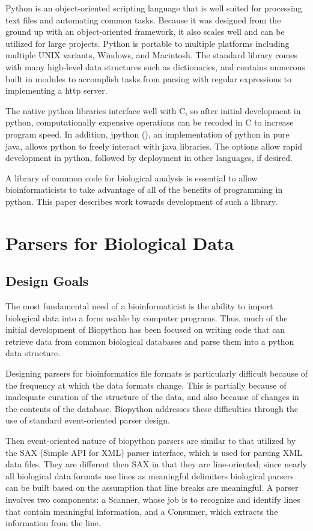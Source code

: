 \documentclass[dvips]{article}
\begin{document}
Python is an object-oriented scripting language that is well suited for processing text files and automating common tasks. Because it was designed from the ground up with an object-oriented framework, it also scales well and can be utilized for large projects.  Python is portable to multiple platforms including multiple UNIX variants, Windows, and Macintosh. The standard library comes with many high-level data structures such as dictionaries, and contains numerous built in modules to accomplish tasks from parsing with regular expressions to implementing a http server.


The native python libraries interface well with C, so after initial development in python, computationally expensive operations can be recoded in C to increase program speed. In addition, jpython (), an implementation of python in pure java, allows python to freely interact with java libraries.  The options allow rapid development in python, followed by deployment in other languages, if desired.


A library of common code for biological analysis is essential to allow bioinformaticists to take advantage of all of the benefits of programming in python. This paper describes work towards development of such a library.


\section{Parsers for Biological Data}


\subsection{Design Goals}


The most fundamental need of a bioinformaticist is the ability to import biological data into a form usable by computer programs. Thus, much of the initial development of Biopython has been focused on writing code that can retrieve data from common biological databases and parse them into a python data structure.


Designing parsers for bioinformatics file formats is particularly difficult because of the frequency at which the data formats change. This is partially because of inadequate curation of the structure of the data, and also because of changes in the contents of the database. Biopython addresses these difficulties through the use of standard event-oriented parser design.


Then event-oriented nature of biopython parsers are similar to that utilized by the SAX (Simple API for XML) parser interface, which is used for parsing XML data files. They are different then SAX in that they are line-oriented; since nearly all biological data formats use lines as meaningful delimiters biological parsers can be built based on the assumption that line breaks are meaningful. A parser involves two components: a Scanner, whose job is to recognize and identify lines that contain meaningful information, and a Consumer, which extracts the information from the line.
\end{document}
